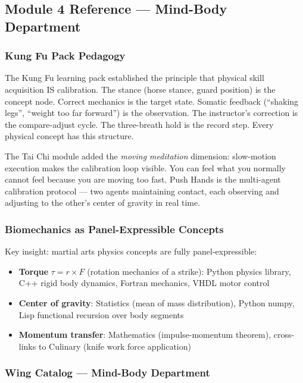 \documentclass[11pt,letterpaper]{article}
\begin{document}
\subsection{Module 4 Reference --- Mind-Body Department}

\subsubsection{Kung Fu Pack Pedagogy}

The Kung Fu learning pack established the principle that physical skill acquisition IS calibration. The stance (horse stance, guard position) is the concept node. Correct mechanics is the target state. Somatic feedback (``shaking legs'', ``weight too far forward'') is the observation. The instructor's correction is the compare-adjust cycle. The three-breath hold is the record step. Every physical concept has this structure.

The Tai Chi module added the \textit{moving meditation} dimension: slow-motion execution makes the calibration loop visible. You can feel what you normally cannot feel because you are moving too fast. Push Hands is the multi-agent calibration protocol --- two agents maintaining contact, each observing and adjusting to the other's center of gravity in real time.

\subsubsection{Biomechanics as Panel-Expressible Concepts}

Key insight: martial arts physics concepts are fully panel-expressible:
\begin{itemize}[leftmargin=1.5em]
  \item \textbf{Torque} $\tau = r \times F$ (rotation mechanics of a strike): Python physics library, C++ rigid body dynamics, Fortran mechanics, VHDL motor control
  \item \textbf{Center of gravity}: Statistics (mean of mass distribution), Python numpy, Lisp functional recursion over body segments
  \item \textbf{Momentum transfer}: Mathematics (impulse-momentum theorem), cross-links to Culinary (knife work force application)
\end{itemize}

\subsubsection{Wing Catalog --- Mind-Body Department}
\end{document}
